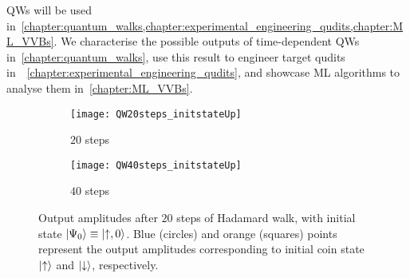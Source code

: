 QWs will be used in~\cref{chapter:quantum_walks,chapter:experimental_engineering_qudits,chapter:ML_VVBs}. We characterise the possible outputs of time-dependent QWs in~\cref{chapter:quantum_walks}, use this result to engineer target qudits in~~\cref{chapter:experimental_engineering_qudits}, and showcase ML algorithms to analyse them in~\cref{chapter:ML_VVBs}.

\begin{figure}[tb]
    \begin{subfigure}{0.5\textwidth}
        \centering
        \caption{$20$ steps}
        \texttt{[image: QW20steps\_initstateUp]}
    \end{subfigure}%
    \begin{subfigure}{0.5\textwidth}
        \centering
        \caption{$40$ steps}
        \texttt{[image: QW40steps\_initstateUp]}
    \end{subfigure}
    \caption{
    	Output amplitudes after $20$ steps of Hadamard walk, with initial state $\ket{\Psi_0}\equiv\ket{\uparrow,0}$.
        Blue (circles) and orange (squares) points represent the output amplitudes corresponding to initial coin state $\ket\uparrow$ and $\ket\downarrow$, respectively.
    }
    \label{fig:intro:hadamardwalk_Nsteps2}
\end{figure}



